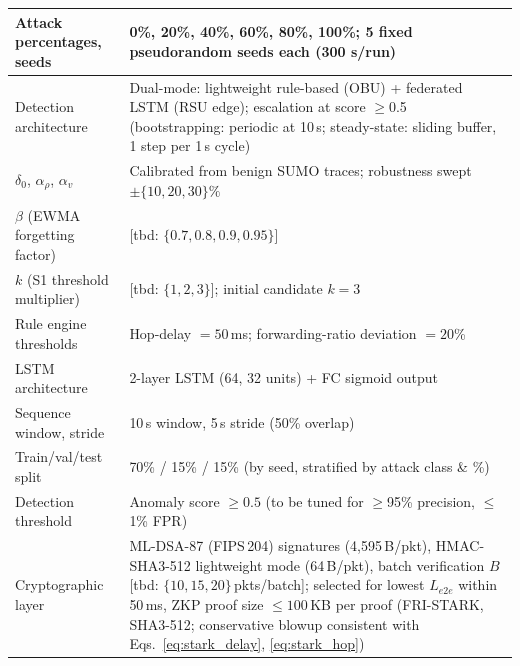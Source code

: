 \documentclass[12pt, a4paper]{report}
\begin{document}
{{\begin{longtable}{|m{5.0cm}|m{9.0cm}|}
            \hline
            Attack percentages, seeds & 0\%, 20\%, 40\%, 60\%, 80\%, 100\%; 5 fixed pseudorandom seeds each (300 s/run) \\
            \hline
            Detection architecture & Dual-mode: lightweight rule-based (OBU) + federated LSTM (RSU edge); escalation at score $\geq$0.5 (bootstrapping: periodic at 10\,s; steady-state: sliding buffer, 1 step per 1\,s cycle) \\
            \hline
            $\delta_0$, $\alpha_\rho$, $\alpha_v$ &
  Calibrated from benign SUMO traces;
  robustness swept $\pm\{10,20,30\}\%$ \\
  \hline
 $\beta$ (EWMA forgetting factor) &
   [tbd: $\{0.7, 0.8, 0.9, 0.95\}$] \\
   \hline
 $k$ (S1 threshold multiplier) &
   [tbd: $\{1, 2, 3\}$]; initial candidate $k{=}3$ \\

            \hline
            Rule engine thresholds & Hop-delay $= 50$\,ms; forwarding-ratio deviation $= 20$\% \\
            \hline
            LSTM architecture & 2-layer LSTM (64, 32 units) + FC sigmoid output \\
            \hline
            Sequence window, stride & 10\,s window, 5\,s stride (50\% overlap) \\
            \hline
            Train/val/test split & 70\% / 15\% / 15\% (by seed, stratified by attack class \& \%) \\
            \hline
            Detection threshold & Anomaly score $\geq 0.5$ (to be tuned for $\geq$95\% precision, $\leq$1\% FPR) \\
            \hline
            Cryptographic layer & ML-DSA-87 (FIPS\,204) signatures (4,595\,B/pkt),
            HMAC-SHA3-512 lightweight mode (64\,B/pkt),
            batch verification $B$ [tbd: $\{10, 15, 20\}$\,pkts/batch];
            selected for lowest $L_{e2e}$ within 50\,ms,  ZKP proof size  $\leq 100$\,KB per proof   (FRI-STARK, SHA3-512; conservative blowup
             consistent with Eqs.~\ref{eq:stark_delay},
            \ref{eq:stark_hop}) \\


\end{longtable}}}
\end{document}
